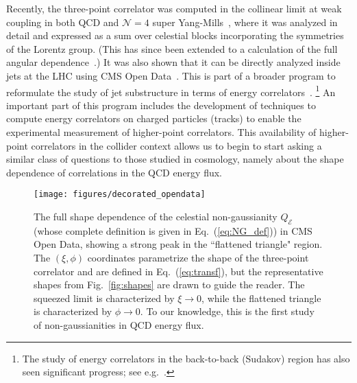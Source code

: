 \documentclass[letterpaper,11pt]{article}
\def\Fig#1{Fig.~{\ref{#1}}}
\def\to{\rightarrow}
\DeclareRobustCommand{\Fig}[1]{Fig.~\ref{#1}}
\DeclareRobustCommand{\Eq}[1]{Eq.~(\ref{#1})}
\def\cN{\mathcal{N}}
\begin{document}
Recently, the three-point correlator was computed in the collinear limit at weak coupling in both QCD and $\cN=4$ super Yang-Mills~\cite{Chang:2022ryc,Chen:2022jhb}, where it was analyzed in detail and expressed as a sum over celestial blocks incorporating the symmetries of the Lorentz group.
%
(This has since been extended to a calculation of the full angular dependence~\cite{Yan:2022cye}.)
%
It was also shown that it can be directly analyzed inside jets at the LHC using CMS Open Data~\cite{Komiske:2022enw}.
%
This is part of a broader program to reformulate the study of jet substructure in terms of energy correlators~\cite{Dixon:2019uzg,Chen:2019bpb,Chen:2020adz,Chen:2020vvp,Chen:2021gdk,Chen:2022jhb,Holguin:2022epo}.%
%
\footnote{The study of energy correlators in the back-to-back (Sudakov) region has also seen significant progress; see e.g.~\cite{Gao:2019ojf,Moult:2018jzp,Moult:2019vou,Ebert:2020sfi,Li:2021txc}.}
%
An important part of this program includes the development of techniques to compute energy correlators on charged particles (tracks) \cite{Chang:2013rca,Chang:2013iba,Chen:2020vvp,Li:2021zcf,Jaarsma:2022kdd} to enable the experimental measurement of higher-point correlators.
%
This availability of higher-point correlators in the collider context allows us to begin to start asking a similar class of questions to those studied in cosmology, namely about the shape dependence of correlations in the QCD energy flux. 


\begin{figure}[t]
\begin{center}
\texttt{[image: figures/decorated\_opendata]}
\caption{
%
The full shape dependence of the celestial non-gaussianity $Q_\mathcal{E}$ (whose complete definition is given in \Eq{eq:NG_def}) in CMS Open Data, showing a strong peak in the  ``flattened triangle" region.
%
The $(\xi, \phi)$ coordinates parametrize the shape of the three-point correlator and are defined in \Eq{eq:transf}, but the representative shapes from \Fig{fig:shapes} are drawn to guide the reader.
%
The squeezed limit is characterized by $\xi\to 0$, while the flattened triangle is characterized by $\phi\to 0$. To our knowledge, this is the first study of non-gaussianities in QCD energy flux.} 
\label{fig:shape_intro}
\end{center}
\end{figure}
\end{document}
